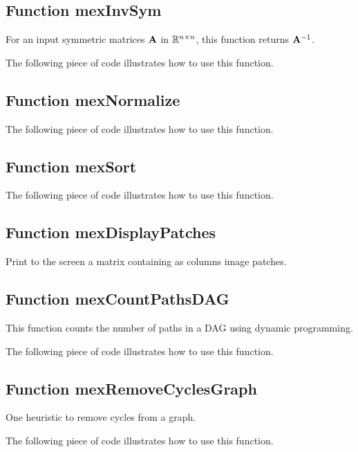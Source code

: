 \documentclass[a4paper, 11pt]{article}
\begin{document}
\subsection{Function mexInvSym}
For an input symmetric matrices ${\mathbf A}$ in ${\mathbb R}^{n \times n}$, this function returns ${\mathbf A}^{-1}$.
%    

The following piece of code illustrates how to use this function.



\subsection{Function mexNormalize}
%    

The following piece of code illustrates how to use this function.


\subsection{Function mexSort}
%    

The following piece of code illustrates how to use this function.


\subsection{Function mexDisplayPatches}
Print to the screen a matrix containing as columns image patches.

\subsection{Function mexCountPathsDAG}
This function counts the number of paths in a DAG using dynamic programming.

The following piece of code illustrates how to use this function.


\subsection{Function mexRemoveCyclesGraph}
One heuristic to remove cycles from a graph.

The following piece of code illustrates how to use this function.

\end{document}
